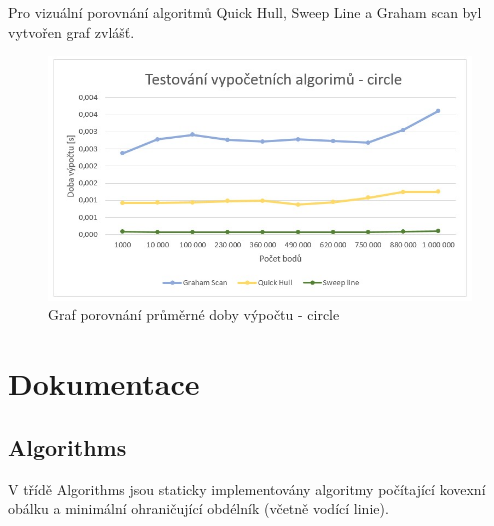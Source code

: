 \documentclass[a4paper, 12pt]{article}
\begin{document}
Pro vizuální porovnání algoritmů Quick Hull, Sweep Line a Graham scan byl vytvořen graf zvlášť.
\begin{figure}[h!]
	\centering
	\includegraphics[width=12cm]{g2_circle.jpg}
	\caption{Graf porovnání průměrné doby výpočtu - circle}
\end{figure}
\clearpage
\section{Dokumentace}

\subsection{Algorithms}
V třídě Algorithms jsou staticky implementovány algoritmy počítající kovexní obálku a minimální ohraničující obdélník (včetně vodící linie).
\end{document}
